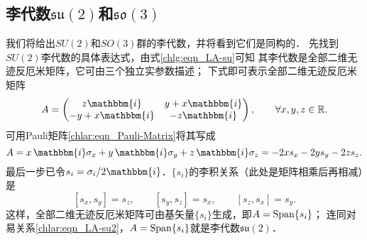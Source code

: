 \subsection{李代数$\mathfrak{su}(2)$和$\mathfrak{so}(3)$}\label{chlar:sec_LA-su2so3}
我们将给出$SU(2)$和$SO(3)$群的李代数，并将看到它们是同构的．
先找到$SU(2)$李代数的具体表达式，由式\eqref{chlg:eqn_LA-su}可知
其李代数是全部二维无迹反厄米矩阵，它可由三个独立实参数描述；
下式即可表示全部二维无迹反厄米矩阵
\begin{equation}
    A=\begin{pmatrix}  z\mathbbm{i} & y+x\mathbbm{i} \\ -y+x \mathbbm{i}  & -z\mathbbm{i} \end{pmatrix},
    \qquad \forall x,y,z\in \mathbb{R} .
\end{equation}
可用Pauli矩阵\eqref{chlar:eqn_Pauli-Matrix}将其写成
\begin{equation}
    A= x \, \mathbbm{i} \sigma_x + y \, \mathbbm{i} \sigma_y + z \, \mathbbm{i} \sigma_z 
     = -2 x s_x -2 y s_y -2 z s_z .
\end{equation}
最后一步已令$s_i=\sigma_i/2\mathbbm{i}$．$\{s_i\}$的李积关系（此处是矩阵相乘后再相减）是
\begin{equation}\label{chlar:eqn_LA-su2}
    [s_x, s_y]=s_z, \qquad
    [s_y, s_z]=s_x, \qquad
    [s_z, s_x]=s_y .
\end{equation}
这样，全部二维无迹反厄米矩阵可由基矢量$\{s_i\}$生成，即$A={\rm Span}\{s_i\}$；
连同对易关系\eqref{chlar:eqn_LA-su2}，$A={\rm Span}\{s_i\}$就是李代数$\mathfrak{su}(2)$．

